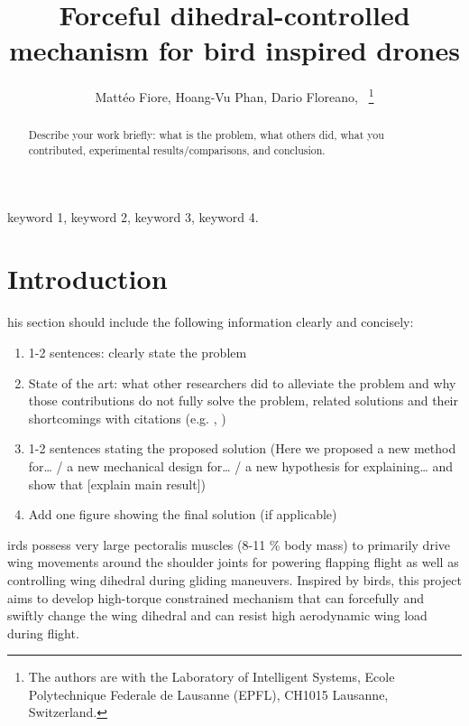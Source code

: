\documentclass[lettersize,journal]{IEEEtran}
\begin{document}
\title{Forceful dihedral-controlled mechanism for bird inspired drones}

\author{Mattéo Fiore, Hoang-Vu Phan, Dario Floreano,~
\thanks{The authors are with
the Laboratory of Intelligent Systems, Ecole Polytechnique Federale de Lausanne (EPFL), CH1015 Lausanne, Switzerland.}}%


\maketitle

\begin{abstract}
Describe your work briefly: what is the problem, what others did, what you contributed, experimental results/comparisons, and conclusion.
\end{abstract}

\begin{IEEEkeywords}
keyword 1, keyword 2, keyword 3, keyword 4.
\end{IEEEkeywords}

\section{Introduction}
his section should include the following information clearly and concisely:
\begin{enumerate}
    \item 1-2 sentences: clearly state the problem
    \item State of the art: what other researchers did to alleviate the problem and why those contributions do not fully solve the problem, related solutions and their shortcomings with citations (e.g. \cite{Bircheretal}, \cite{Oettershagenetal})
    \item 1-2 sentences stating the proposed solution (Here we proposed a new method for… / a new mechanical design for… / a new hypothesis for explaining… and show that [explain main result])
    \item Add one figure showing the final solution (if applicable)
\end{enumerate}

irds possess very large pectoralis muscles (8-11 \% body mass) to primarily drive wing movements around the shoulder joints for
powering flapping flight as well as controlling wing dihedral during gliding maneuvers. Inspired by birds, this project aims to
develop high-torque constrained mechanism that can forcefully and swiftly change the wing dihedral and can resist high aerodynamic
wing load during flight. 
\end{document}
